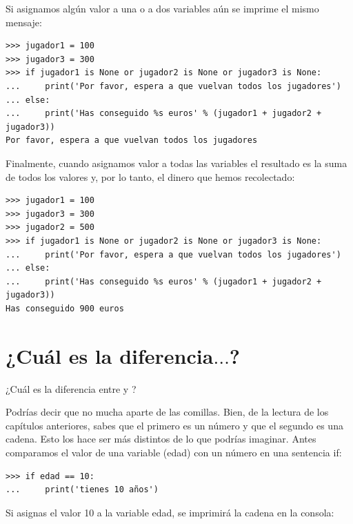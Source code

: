 Si asignamos algún valor a una o a dos variables aún se imprime el mismo mensaje:

\begin{listing}
\begin{verbatim}
>>> jugador1 = 100
>>> jugador3 = 300
>>> if jugador1 is None or jugador2 is None or jugador3 is None:
...     print('Por favor, espera a que vuelvan todos los jugadores')
... else:
...     print('Has conseguido %s euros' % (jugador1 + jugador2 + jugador3))
Por favor, espera a que vuelvan todos los jugadores
\end{verbatim}
\end{listing}

\noindent
Finalmente, cuando asignamos valor a todas las variables el resultado es la suma de todos los valores y, por lo tanto, el dinero que hemos recolectado:

\begin{listing}
\begin{verbatim}
>>> jugador1 = 100
>>> jugador3 = 300
>>> jugador2 = 500
>>> if jugador1 is None or jugador2 is None or jugador3 is None:
...     print('Por favor, espera a que vuelvan todos los jugadores')
... else:
...     print('Has conseguido %s euros' % (jugador1 + jugador2 + jugador3))
Has conseguido 900 euros
\end{verbatim}
\end{listing}

\section{¿Cuál es la diferencia$\ldots$?}\label{whatsthedifference}

¿Cuál es la diferencia entre  y ?
\par
Podrías decir que no mucha aparte de las comillas.  Bien, de la lectura de los capítulos anteriores, sabes que el primero es un número y que el segundo es una cadena. Esto los hace ser más distintos de lo que podrías imaginar.  Antes comparamos el valor de una variable (edad) con un número en una sentencia if:

\begin{listing}
\begin{verbatim}
>>> if edad == 10:
...     print('tienes 10 años')
\end{verbatim}
\end{listing}

Si asignas el valor 10 a la variable edad, se imprimirá la cadena en la consola:

